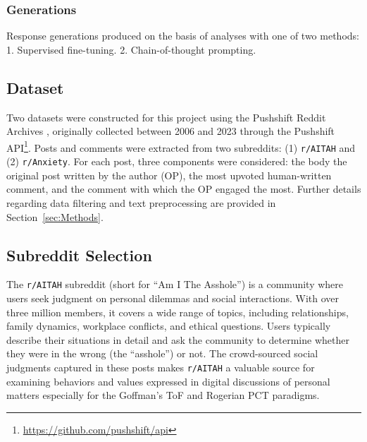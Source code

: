 \subsubsection{Generations}

\textcolor{black!60}{Response generations produced on the basis of analyses with one of two methods: 1. Supervised fine-tuning.
2. Chain-of-thought prompting.}
\textcolor{black!30}{\lipsum[9-10]}

\subsection{Dataset}

Two datasets were constructed for this project using the Pushshift Reddit Archives \cite{pushshift}, originally collected between 2006 and 2023 through the Pushshift API\footnote{\url{https://github.com/pushshift/api}}. Posts and comments were extracted from two subreddits: (1) \texttt{r/AITAH} and (2) \texttt{r/Anxiety}. For each post, three components were considered: the body the original post written by the author (OP), the most upvoted human-written comment, and the comment with which the OP engaged the most. Further details regarding data filtering and text preprocessing are provided in Section~\ref{sec:Methods}.  

\subsection{Subreddit Selection}

The \texttt{r/AITAH} subreddit (short for ``Am I The Asshole'') is a community where users seek judgment on personal dilemmas and social interactions. With over three million members, it covers a wide range of topics, including relationships, family dynamics, workplace conflicts, and ethical questions. Users typically describe their situations in detail and ask the community to determine whether they were in the wrong (the ``asshole'') or not. The crowd-sourced social judgments captured in these posts makes \texttt{r/AITAH} a valuable source for examining behaviors and values expressed in digital discussions of personal matters especially for the Goffman's ToF and Rogerian PCT paradigms.  

